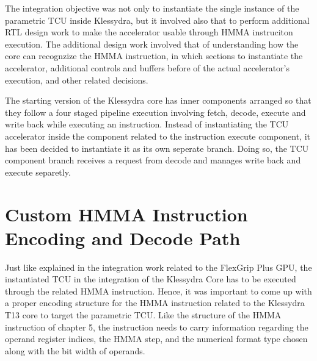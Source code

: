 
The integration objective was not only to instantiate the single instance of the parametric TCU inside Klessydra, but it involved also that to perform additional RTL design work to make the accelerator usable through HMMA instruciton execution. The additional design work involved that of understanding how the core can recognzize the HMMA instruction, in which sections to instantiate the accelerator, additional controls and buffers before of the actual accelerator's execution, and other related decisions.

The starting version of the Klessydra core has inner components arranged so that they follow a four staged pipeline execution involving fetch, decode, execute and write back while executing an instruction. Instead of instantiating the TCU accelerator inside the component related to the instruction execute component, it has been decided to instantiate it as its own seperate branch. Doing so, the TCU component branch receives a request from decode and manages write back and execute separetly.

\section{Custom HMMA Instruction Encoding and Decode Path}

Just like explained in the integration work related to the FlexGrip Plus GPU, the instantiated TCU in the integration of the Klessydra Core has to be executed through the related HMMA instruction. Hence, it was important to come up with a proper encoding structure for the HMMA instruction related to the Klessydra T13 core to target the parametric TCU. Like the structure of the HMMA instruction of chapter 5, the instruction needs to carry information regarding the operand register indices, the HMMA step, and the numerical format type chosen along with the bit width of operands. 


